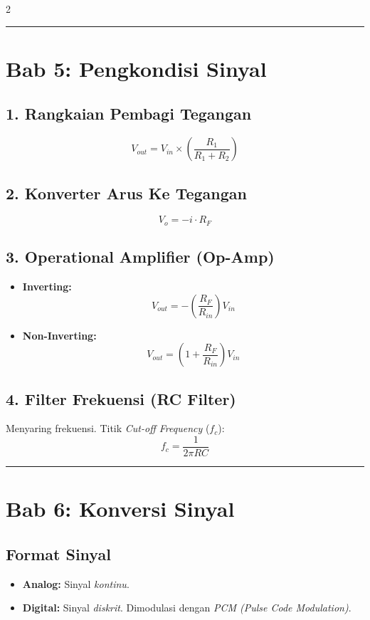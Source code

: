 \documentclass[10pt]{article}
\begin{document}
\begin{multicols}{2}
\noindent\rule{\columnwidth}{0.4pt}

\section*{Bab 5: Pengkondisi Sinyal}
\label{bab5}

\subsection*{1. Rangkaian Pembagi Tegangan}
\[ V_{out} = V_{in} \times \left( \frac{R_1}{R_1 + R_2} \right) \]

\subsection*{2. Konverter Arus Ke Tegangan}
\[ V_o = -i \cdot R_F \]

\subsection*{3. Operational Amplifier (Op-Amp)}
\begin{itemize}
    \item \textbf{Inverting:}
    \[ V_{out} = -\left( \frac{R_F}{R_{in}} \right) V_{in} \]
    \item \textbf{Non-Inverting:}
    \[ V_{out} = \left( 1 + \frac{R_F}{R_{in}} \right) V_{in} \]
\end{itemize}

\subsection*{4. Filter Frekuensi (RC Filter)}
Menyaring frekuensi. Titik \textit{Cut-off Frequency} ($f_c$):
\[ f_c = \frac{1}{2 \pi R C} \]

\noindent\rule{\columnwidth}{0.4pt}

\section*{Bab 6: Konversi Sinyal}
\label{bab6}

\subsection*{Format Sinyal}
\begin{itemize}
    \item \textbf{Analog:} Sinyal \textit{kontinu}.
    \item \textbf{Digital:} Sinyal \textit{diskrit}. Dimodulasi dengan \textit{PCM (Pulse Code Modulation)}.
\end{itemize}


\end{multicols}
\end{document}

